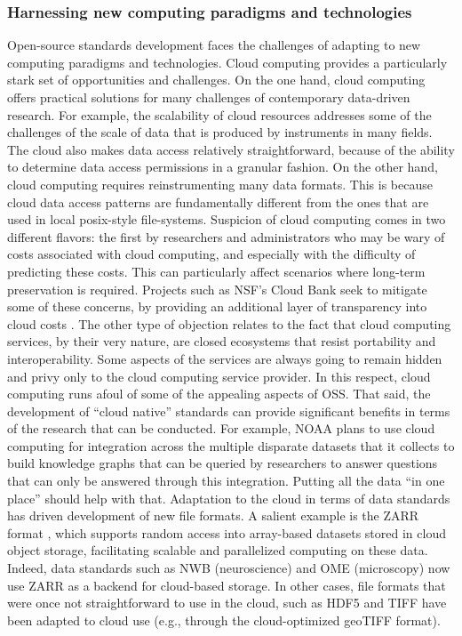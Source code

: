 \documentclass[
  number]{elsarticle}
\begin{document}
\subsubsection{Harnessing new computing paradigms and
technologies}\label{harnessing-new-computing-paradigms-and-technologies}

Open-source standards development faces the challenges of adapting to
new computing paradigms and technologies. Cloud computing provides a
particularly stark set of opportunities and challenges. On the one hand,
cloud computing offers practical solutions for many challenges of
contemporary data-driven research. For example, the scalability of cloud
resources addresses some of the challenges of the scale of data that is
produced by instruments in many fields. The cloud also makes data access
relatively straightforward, because of the ability to determine data
access permissions in a granular fashion. On the other hand, cloud
computing requires reinstrumenting many data formats. This is because
cloud data access patterns are fundamentally different from the ones
that are used in local posix-style file-systems. Suspicion of cloud
computing comes in two different flavors: the first by researchers and
administrators who may be wary of costs associated with cloud computing,
and especially with the difficulty of predicting these costs. This can
particularly affect scenarios where long-term preservation is required.
Projects such as NSF's Cloud Bank seek to mitigate some of these
concerns, by providing an additional layer of transparency into cloud
costs \citep{Norman2021CloudBank}. The other type of objection relates
to the fact that cloud computing services, by their very nature, are
closed ecosystems that resist portability and interoperability. Some
aspects of the services are always going to remain hidden and privy only
to the cloud computing service provider. In this respect, cloud
computing runs afoul of some of the appealing aspects of OSS. That said,
the development of ``cloud native'' standards can provide significant
benefits in terms of the research that can be conducted. For example,
NOAA plans to use cloud computing for integration across the multiple
disparate datasets that it collects to build knowledge graphs that can
be queried by researchers to answer questions that can only be answered
through this integration. Putting all the data ``in one place'' should
help with that. Adaptation to the cloud in terms of data standards has
driven development of new file formats. A salient example is the ZARR
format \citep{zarr}, which supports random access into array-based
datasets stored in cloud object storage, facilitating scalable and
parallelized computing on these data. Indeed, data standards such as NWB
(neuroscience) and OME (microscopy) now use ZARR as a backend for
cloud-based storage. In other cases, file formats that were once not
straightforward to use in the cloud, such as HDF5 and TIFF have been
adapted to cloud use (e.g., through the cloud-optimized geoTIFF format).
\end{document}
